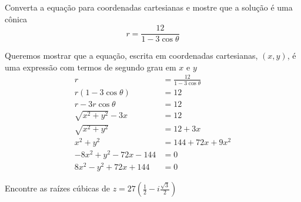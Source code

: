 \documentclass[a4paper,12pt,fleqn]{article}
\begin{document}

Converta a equação para coordenadas cartesianas e mostre que a solução é uma cônica
\[
  r = \frac{12}{1 - 3\cos\theta}
\]
\clearpagequestiononly

\begin{answer}
  Queremos mostrar que a equação, escrita em coordenadas cartesianas, $(x, y)$,
  é uma expressão com termos de segundo grau em $x$ e $y$
  \begin{align*}
    r                       & = \frac{12}{1 - 3\cos\theta} \\
    r(1 - 3\cos\theta)      & = 12                         \\
    r - 3r\cos\theta        & = 12                         \\
    \sqrt{x^2 + y^2} - 3x   & = 12                         \\
    \sqrt{x^2 + y^2}        & = 12 + 3x                    \\
    x^2 + y^2               & = 144 + 72x + 9x^2           \\
    -8x^2 + y^2 - 72x - 144 & = 0                          \\
    8x^2 - y^2 + 72x + 144  & = 0
  \end{align*}
\end{answer}

Encontre as raízes cúbicas de \( z = 27\left(\frac{1}{2} - i\frac{\sqrt{3}}{2}\right) \)
\clearpagequestiononly
\end{document}
